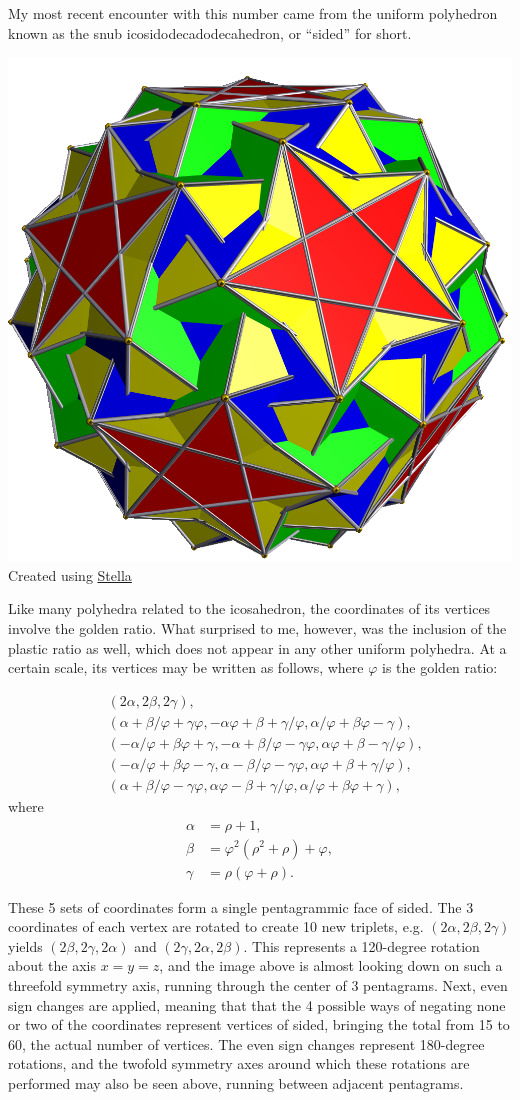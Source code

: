 \documentclass{article}
\begin{document}
My most recent encounter with this number
came from the uniform polyhedron known as
the snub icosidodecadodecahedron, or ``sided'' for short.

\begin{center}
  \includegraphics[width=0.25\linewidth]{sided.png} \\
  Created using \href{http://www.software3d.com/Stella.php}{Stella}
\end{center}

Like many polyhedra related to the icosahedron,
the coordinates of its vertices involve the golden ratio.
What surprised to me, however,
was the inclusion of the plastic ratio as well,
which does not appear in any other uniform polyhedra.
At a certain scale, its vertices may be written as follows,
where $\varphi$ is the golden ratio:

\begin{align*}
  & (2\alpha, 2\beta, 2\gamma), \\
  & (\alpha+\beta/\varphi+\gamma\varphi,
  -\alpha\varphi+\beta+\gamma/\varphi,
  \alpha/\varphi+\beta\varphi-\gamma), \\
  & (-\alpha/\varphi+\beta\varphi+\gamma,
  -\alpha+\beta/\varphi-\gamma\varphi,
  \alpha\varphi+\beta-\gamma/\varphi), \\
  & (-\alpha/\varphi+\beta\varphi-\gamma,
  \alpha-\beta/\varphi-\gamma\varphi,
  \alpha\varphi+\beta+\gamma/\varphi), \\
  & (\alpha+\beta/\varphi-\gamma\varphi,
  \alpha\varphi-\beta+\gamma/\varphi,
  \alpha/\varphi+\beta\varphi+\gamma),
\end{align*}
where
\begin{align*}
  \alpha &= \rho+1, \\
  \beta &= \varphi^2(\rho^2+\rho)+\varphi, \\
  \gamma &= \rho(\varphi+\rho).
\end{align*}

These 5 sets of coordinates form a single pentagrammic face of sided.
The 3 coordinates of each vertex are rotated to create 10 new triplets,
e.g. $(2\alpha, 2\beta, 2\gamma)$ yields
$(2\beta, 2\gamma, 2\alpha)$ and $(2\gamma, 2\alpha, 2\beta)$.
This represents a 120-degree rotation about the axis $x=y=z$,
and the image above is almost looking down on such a threefold symmetry axis,
running through the center of 3 pentagrams.
Next, even sign changes are applied,
meaning that that the 4 possible ways of negating none or two of the coordinates
represent vertices of sided,
bringing the total from 15 to 60, the actual number of vertices.
The even sign changes represent 180-degree rotations,
and the twofold symmetry axes around which these rotations are performed
may also be seen above, running between adjacent pentagrams.
\end{document}
